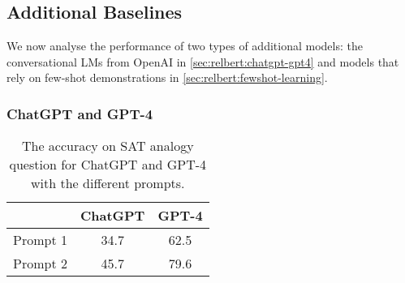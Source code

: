 \documentclass[3p]{elsarticle}
\begin{document}
{\subsection{Additional Baselines}\label{sec:relbert:additional-baselines}
We now analyse the performance of two types of additional models: the conversational LMs from OpenAI in \autoref{sec:relbert:chatgpt-gpt4} and models that rely on few-shot demonstrations in \autoref{sec:relbert:fewshot-learning}.

\subsubsection{ChatGPT and GPT-4} \label{sec:relbert:chatgpt-gpt4}

\begin{table}[!t]
\centering
\begin{tabular}{lcc}
\toprule
         & ChatGPT & GPT-4 \\ \midrule
Prompt 1 & 34.7    & 62.5  \\
Prompt 2 & 45.7    & 79.6  \\ 
\bottomrule
\end{tabular}
\caption{The accuracy on SAT analogy question for ChatGPT and GPT-4 with the different prompts.}
\label{tab:relbert:chatgpt-gpt4}
\end{table}

}
\end{document}
